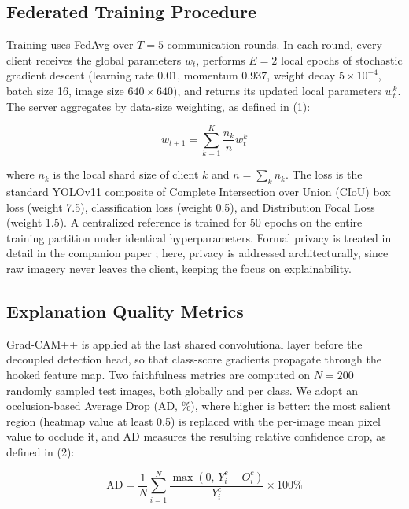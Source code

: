 \documentclass[9pt,twocolumn]{extarticle}
\begin{document}
\subsection{Federated Training Procedure}

Training uses FedAvg over $T=5$ communication rounds. In each round, every client receives the global parameters $w_t$, performs $E=2$ local epochs of stochastic gradient descent (learning rate 0.01, momentum 0.937, weight decay $5\times10^{-4}$, batch size 16, image size $640\times640$), and returns its updated local parameters $w_t^k$. The server aggregates by data-size weighting, as defined in (1):

\begin{equation}
w_{t+1} = \sum_{k=1}^{K} \frac{n_k}{n} w_t^k
\label{eq:fedavg}
\end{equation}

where $n_k$ is the local shard size of client $k$ and $n=\sum_k n_k$. The loss is the standard YOLOv11 composite of Complete Intersection over Union (CIoU) box loss (weight 7.5), classification loss (weight 0.5), and Distribution Focal Loss (weight 1.5). A centralized reference is trained for 50 epochs on the entire training partition under identical hyperparameters. Formal privacy is treated in detail in the companion paper \cite{dianty2026}; here, privacy is addressed architecturally, since raw imagery never leaves the client, keeping the focus on explainability.

\subsection{Explanation Quality Metrics}

Grad-CAM++ is applied at the last shared convolutional layer before the decoupled detection head, so that class-score gradients propagate through the hooked feature map. Two faithfulness metrics are computed on $N=200$ randomly sampled test images, both globally and per class. We adopt an occlusion-based Average Drop (AD, \%), where higher is better: the most salient region (heatmap value at least 0.5) is replaced with the per-image mean pixel value to occlude it, and AD measures the resulting relative confidence drop, as defined in (2):

\begin{equation}
\text{AD} = \frac{1}{N}\sum_{i=1}^{N} \frac{\max(0,\, Y_i^c - O_i^c)}{Y_i^c} \times 100\%
\label{eq:ad}
\end{equation}
\end{document}
